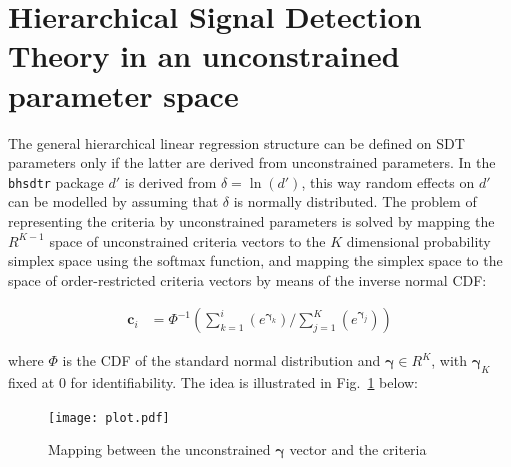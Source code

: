\documentclass[oneside,a4paper]{article}
\begin{document}
\section{Hierarchical Signal Detection Theory in an unconstrained
  parameter space}

The general hierarchical linear regression structure can be defined on
SDT parameters only if the latter are derived from unconstrained
parameters. In the \texttt{bhsdtr} package $d'$ is derived from
$\delta = \ln(d')$, this way random effects on $d'$ can be modelled by
assuming that $\delta$ is normally distributed. The problem of
representing the criteria by unconstrained parameters
is solved by mapping the $R^{K-1}$ space of unconstrained criteria
vectors to the $K$ dimensional probability simplex space using the
softmax function, and mapping the simplex space to the space of
order-restricted criteria vectors by means of the inverse normal CDF:

\begin{align}
  \bm{c}_i &= \Phi^{-1}(\sum_{k = 1}^i(e^{\bm{\gamma}_k}) /
             \sum_{j=1}^K(e^{\bm{\gamma}_j}))
\label{eq:1}
\end{align}

\noindent where $\Phi$ is the CDF of the standard normal distribution
and $\bm{\gamma} \in R^K$, with $\bm{\gamma}_K$ fixed at $0$ for
identifiability. The idea is illustrated in Fig.~\ref{fig:2} below:

\begin{figure}[H]
  \centering
  \texttt{[image: plot.pdf]}
  \caption{Mapping between the unconstrained $\bm{\gamma}$ vector and
    the criteria}
  \label{fig:2}
\end{figure}
\end{document}
